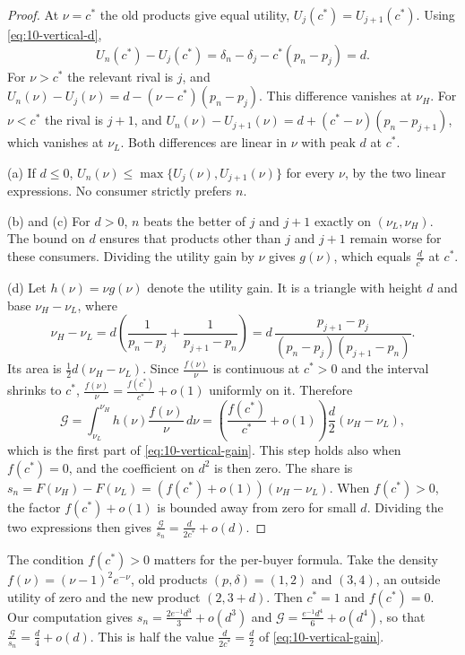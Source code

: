 \begin{proof}
At $\nu = c^*$ the old products give equal utility, $U_j(c^*) = U_{j+1}(c^*)$. Using \eqref{eq:10-vertical-d},
\begin{equation*}
U_n(c^*) - U_j(c^*) = \delta_n - \delta_j - c^*(p_n - p_j) = d .
\end{equation*}
For $\nu > c^*$ the relevant rival is $j$, and $U_n(\nu) - U_j(\nu) = d - (\nu - c^*)(p_n - p_j)$. This difference
vanishes at $\nu_H$. For $\nu < c^*$ the rival is $j+1$, and $U_n(\nu) - U_{j+1}(\nu) = d + (c^* - \nu)(p_n -
p_{j+1})$, which vanishes at $\nu_L$. Both differences are linear in $\nu$ with peak $d$ at $c^*$.

(a) If $d \le 0$, $U_n(\nu) \le \max\{U_j(\nu),U_{j+1}(\nu)\}$ for every $\nu$, by the two linear expressions. No
consumer strictly prefers $n$.

(b) and (c) For $d > 0$, $n$ beats the better of $j$ and $j+1$ exactly on $(\nu_L,\nu_H)$. The bound on $d$
ensures that products other than $j$ and $j+1$ remain worse for these consumers. Dividing the utility gain by
$\nu$ gives $g(\nu)$, which equals $\frac{d}{c^*}$ at $c^*$.

(d) Let $h(\nu) = \nu g(\nu)$ denote the utility gain. It is a triangle with height $d$ and base $\nu_H - \nu_L$,
where
\begin{equation*}
\nu_H - \nu_L = d\left(\frac{1}{p_n - p_j} + \frac{1}{p_{j+1} - p_n}\right)
= d\,\frac{p_{j+1} - p_j}{(p_n - p_j)(p_{j+1} - p_n)} .
\end{equation*}
Its area is $\frac{1}{2}d(\nu_H - \nu_L)$. Since $\frac{f(\nu)}{\nu}$ is continuous at $c^* > 0$ and the interval
shrinks to $c^*$, $\frac{f(\nu)}{\nu} = \frac{f(c^*)}{c^*} + o(1)$ uniformly on it. Therefore
\begin{equation*}
\mathcal{G} = \int_{\nu_L}^{\nu_H}h(\nu)\frac{f(\nu)}{\nu}\,d\nu
= \left(\frac{f(c^*)}{c^*} + o(1)\right)\frac{d}{2}(\nu_H - \nu_L),
\end{equation*}
which is the first part of \eqref{eq:10-vertical-gain}. This step holds also when $f(c^*) = 0$, and the
coefficient on $d^2$ is then zero. The share is $s_n = F(\nu_H) - F(\nu_L) = (f(c^*) + o(1))(\nu_H - \nu_L)$.
When $f(c^*) > 0$, the factor $f(c^*) + o(1)$ is bounded away from zero for small $d$. Dividing the two
expressions then gives $\frac{\mathcal{G}}{s_n} = \frac{d}{2c^*} + o(d)$.
\end{proof}

The condition $f(c^*) > 0$ matters for the per-buyer formula. Take the density $f(\nu) = (\nu - 1)^2e^{-\nu}$,
old products $(p,\delta) = (1,2)$ and $(3,4)$, an outside utility of zero and the new product $(2,3+d)$. Then
$c^* = 1$ and $f(c^*) = 0$. Our computation gives $s_n = \frac{2e^{-1}d^3}{3} + o(d^3)$ and
$\mathcal{G} = \frac{e^{-1}d^4}{6} + o(d^4)$, so that $\frac{\mathcal{G}}{s_n} = \frac{d}{4} + o(d)$. This is half
the value $\frac{d}{2c^*} = \frac{d}{2}$ of \eqref{eq:10-vertical-gain}.

